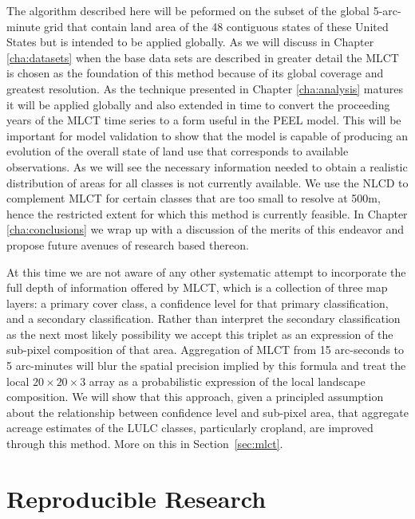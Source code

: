 The algorithm described here will be peformed on the subset of the
global 5-arc-minute grid that contain land area of the 48 contiguous
states of these United States but is intended to be applied globally.
As we will discuss in Chapter \ref{cha:datasets} when the base data
sets are described in greater detail the MLCT is chosen as the
foundation of this method because of its global coverage and greatest
resolution.  As the technique presented in Chapter \ref{cha:analysis}
matures it will be applied globally and also extended in time to
convert the proceeding years of the MLCT time series to a form useful
in the PEEL model.  This will be important for model validation to
show that the model is capable of producing an evolution of the
overall state of land use that corresponds to available observations.
As we will see the necessary information needed to obtain a realistic
distribution of areas for all classes is not currently available.  We
use the NLCD to complement MLCT for certain classes that are too small
to resolve at 500m, hence the restricted extent for which this method
is currently feasible.  In Chapter \ref{cha:conclusions} we wrap up
with a discussion of the merits of this endeavor and propose future
avenues of research based thereon.

At this time we are not aware of any other systematic attempt to
incorporate the full depth of information offered by MLCT, which is a
collection of three map layers: a primary cover class, a confidence
level for that primary classification, and a secondary classification.
Rather than interpret the secondary classification as the next most
likely possibility we accept this triplet as an expression of the
sub-pixel composition of that area.  Aggregation of MLCT from 15
arc-seconds to 5 arc-minutes will blur the spatial precision implied
by this formula and treat the local $20 \times 20 \times 3$ array as a
probabilistic expression of the local landscape composition.  We will
show that this approach, given a principled assumption about the
relationship between confidence level and sub-pixel area, that
aggregate acreage estimates of the LULC classes, particularly
cropland, are improved through this method.  More on this in Section~\ref{sec:mlct}.

\section{Reproducible Research}
\label{sec:reproducible}

